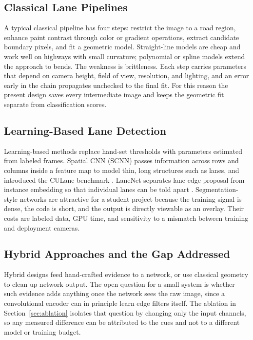 \documentclass[10pt,a4paper,twocolumn]{article}
\begin{document}
\subsection{Classical Lane Pipelines}
A typical classical pipeline has four steps: restrict the image to a road region, enhance paint contrast through color or gradient operations, extract candidate boundary pixels, and fit a geometric model. Straight-line models are cheap and work well on highways with small curvature; polynomial or spline models extend the approach to bends. The weakness is brittleness. Each step carries parameters that depend on camera height, field of view, resolution, and lighting, and an error early in the chain propagates unchecked to the final fit. For this reason the present design saves every intermediate image and keeps the geometric fit separate from classification scores.

\subsection{Learning-Based Lane Detection}
Learning-based methods replace hand-set thresholds with parameters estimated from labeled frames. Spatial CNN (SCNN) passes information across rows and columns inside a feature map to model thin, long structures such as lanes, and introduced the CULane benchmark \cite{pan2018}. LaneNet separates lane-edge proposal from instance embedding so that individual lanes can be told apart \cite{neven2018a,neven2018b}. Segmentation-style networks are attractive for a student project because the training signal is dense, the code is short, and the output is directly viewable as an overlay. Their costs are labeled data, GPU time, and sensitivity to a mismatch between training and deployment cameras.

\subsection{Hybrid Approaches and the Gap Addressed}
Hybrid designs feed hand-crafted evidence to a network, or use classical geometry to clean up network output. The open question for a small system is whether such evidence adds anything once the network sees the raw image, since a convolutional encoder can in principle learn edge filters itself. The ablation in Section~\ref{sec:ablation} isolates that question by changing only the input channels, so any measured difference can be attributed to the cues and not to a different model or training budget.
\end{document}
